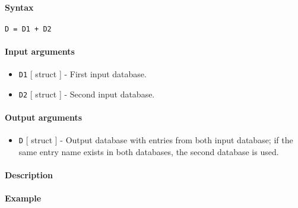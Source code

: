 


	\paragraph{Syntax}\label{syntax}

\begin{verbatim}
D = D1 + D2
\end{verbatim}

\paragraph{Input arguments}\label{input-arguments}

\begin{itemize}
\item
  \texttt{D1} {[} struct {]} - First input database.
\item
  \texttt{D2} {[} struct {]} - Second input database.
\end{itemize}

\paragraph{Output arguments}\label{output-arguments}

\begin{itemize}
\itemsep1pt\parskip0pt
\item
  \texttt{D} {[} struct {]} - Output database with entries from both
  input database; if the same entry name exists in both databases, the
  second database is used.
\end{itemize}

\paragraph{Description}\label{description}

\paragraph{Example}\label{example}



